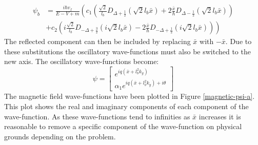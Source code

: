 				\begin{align}
					\psi_{b}&=\frac{i\hbar v_{f}}{E-V+m}\left(c_{1}\left(\frac{\sqrt{2}}{l_{b}}D_{\Delta+\frac{1}{2}}\left(\sqrt{2}l_{b}{\bar x}\right)+2\frac{{\bar x}}{\hbar}D_{\Delta-\frac{1}{2}}\left(\sqrt{2}l_{b}{\bar x}\right)\right)\right.\\
					&+\left.c_{2}\left(i\frac{\sqrt{2}}{l_{b}}D_{-\Delta+\frac{3}{2}}\left(i\sqrt{2}l_{b}{\bar x}\right)-2\frac{{\bar x}}{\hbar}D_{-\Delta+\frac{1}{2}}\left(i\sqrt{2}l_{b}{\bar x}\right)\right)\right)
					\label{introduction-mag-b}
				\end{align}
				The reflected component can then be included by replacing $\bar{x}$ with $-\bar{x}$. Due to these substitutions the oscillatory wave-functions must also be switched to the new axis. The oscillatory wave-functions become:
				\begin{equation}
					\psi=
					\left[\begin{array}{ccc}
						e^{iq\left({\bar x}+l_{b}^{2}k_{y}\right)}\\
						\alpha_{1}e^{iq\left({\bar x}+l_{b}^{2}k_{y}\right)+i\theta}
					\end{array}\right]
				\end{equation}
				The magnetic field wave-functions have been plotted in Figure \ref{magnetic-psi-a}. This plot shows the real and imaginary components of each component of the wave-function. As these wave-functions tend to infinities as ${\bar x}$ increases it is reasonable to remove a specific component of the wave-function on physical grounds depending on the problem.
